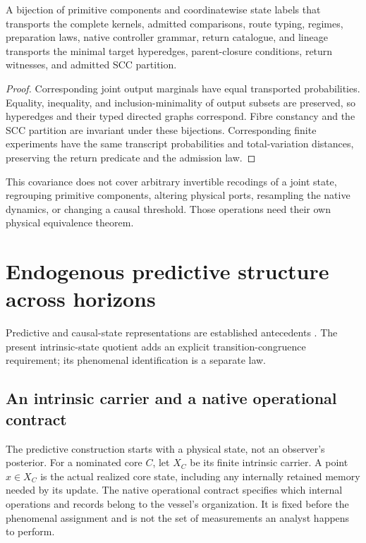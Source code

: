 \begin{proposition}
\label{prop:spc2-individuation-covariance}
A bijection of primitive components and coordinatewise state labels that
transports the complete kernels, admitted comparisons, route typing,
regimes, preparation laws, native controller grammar, return catalogue,
and lineage transports the minimal target hyperedges, parent-closure
conditions, return witnesses, and admitted SCC partition.
\end{proposition}
\begin{proof}
Corresponding joint output marginals have equal transported probabilities.
Equality, inequality, and inclusion-minimality of output subsets are
preserved, so hyperedges and their typed directed graphs correspond.
Fibre constancy and the SCC partition are invariant under these
bijections. Corresponding finite experiments have the same transcript
probabilities and total-variation distances, preserving the return
predicate and the admission law.
\end{proof}

This covariance does not cover arbitrary invertible recodings of a joint
state, regrouping primitive components, altering physical ports,
resampling the native dynamics, or changing a causal threshold. Those
operations need their own physical equivalence theorem.

\endgroup

\chapter{Endogenous predictive structure across horizons}\label{ch:predictive}
Predictive and causal-state representations are established antecedents \cite{Shalizi2001,Littman2002}. The present intrinsic-state quotient adds an explicit transition-congruence requirement; its phenomenal identification is a separate law.
\section{An intrinsic carrier and a native operational contract}
\label{sec:spc2-native-contract}
The predictive construction starts with a physical state, not an
observer's posterior. For a nominated core $C$, let $X_C$ be its finite
intrinsic carrier. A point $x\in X_C$ is the actual realized core state,
including any internally retained memory needed by its update. The
native operational contract specifies which internal operations and
records belong to the vessel's organization. It is fixed before the
phenomenal assignment and is not the set of measurements an analyst
happens to perform.

